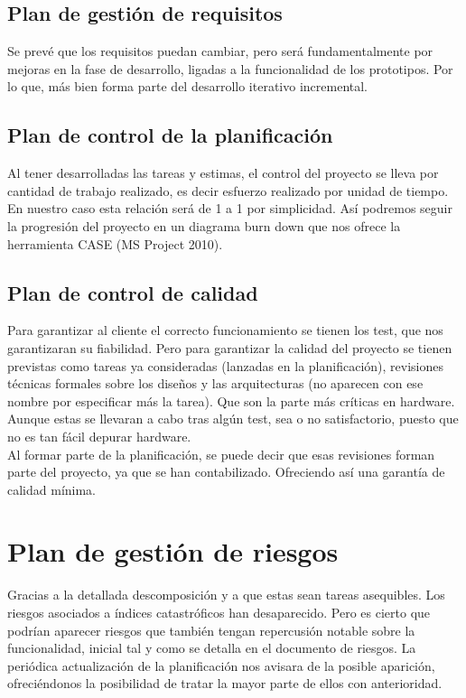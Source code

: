 \subsection{Plan de gestión de requisitos}
Se prevé que los requisitos puedan cambiar, pero será fundamentalmente por mejoras en la fase de desarrollo, ligadas a la funcionalidad de los prototipos. Por lo que, más bien forma parte del desarrollo iterativo incremental.
\subsection{Plan de control de la planificación}
Al tener desarrolladas las tareas y estimas, el control del proyecto se lleva por cantidad de trabajo realizado, es decir esfuerzo realizado por unidad de tiempo. En nuestro caso esta relación será de 1 a 1 por simplicidad. Así podremos seguir la progresión del proyecto en un diagrama burn down que nos ofrece la herramienta CASE (MS Project 2010).
\subsection{Plan de control de calidad}
Para garantizar al cliente el correcto funcionamiento se tienen los test, que nos garantizaran su fiabilidad. Pero para garantizar la calidad del proyecto se tienen previstas como tareas ya consideradas (lanzadas en la planificación), revisiones técnicas formales sobre los diseños y las arquitecturas (no aparecen con ese nombre por especificar más la tarea). Que son la parte más críticas en hardware. Aunque estas se llevaran a cabo tras algún test, sea o no satisfactorio, puesto que no es tan fácil depurar hardware. \\

Al formar parte de la planificación, se puede decir que esas revisiones forman parte del proyecto, ya que se han contabilizado. Ofreciendo así una garantía de calidad mínima.
\section{Plan de gestión de riesgos}
Gracias a la detallada descomposición y a que estas sean tareas asequibles. Los riesgos asociados a índices catastróficos han desaparecido. Pero es cierto que podrían aparecer riesgos que también tengan repercusión notable sobre la funcionalidad, inicial tal y como se detalla en el documento de riesgos. La periódica actualización de la planificación nos avisara de la posible aparición, ofreciéndonos la posibilidad de tratar la mayor parte de ellos con anterioridad.
